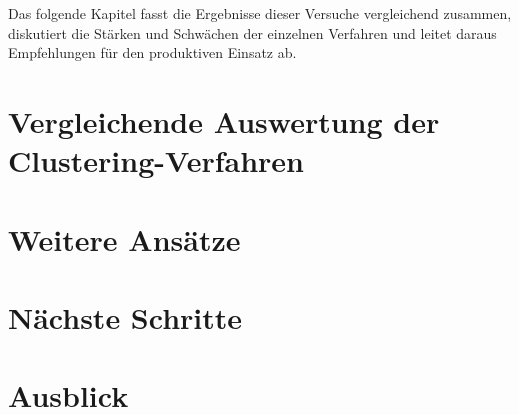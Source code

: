 Das folgende Kapitel fasst die Ergebnisse dieser Versuche vergleichend zusammen, diskutiert die Stärken und Schwächen der einzelnen Verfahren und leitet daraus Empfehlungen für den produktiven Einsatz ab.

\section{Vergleichende Auswertung der Clustering-Verfahren}

\section{Weitere Ansätze}



\section{Nächste Schritte}

\section{Ausblick}
